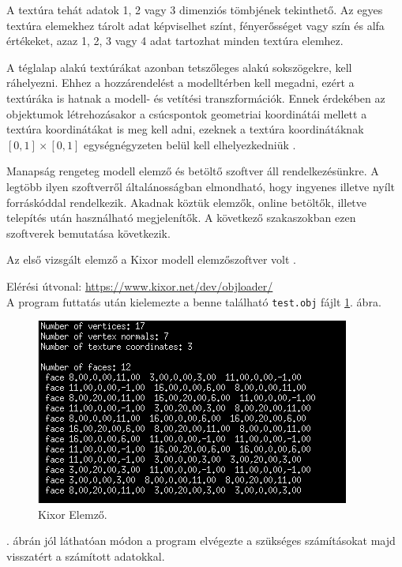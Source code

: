 A textúra tehát adatok 1, 2 vagy 3 dimenziós tömbjének tekinthető. Az egyes textúra elemekhez tárolt adat képviselhet színt, fényerősséget vagy szín és alfa értékeket, azaz 1, 2, 3 vagy 4 adat  tartozhat minden textúra elemhez.

A téglalap alakú textúrákat azonban tetszőleges alakú sokszögekre, kell ráhelyezni. Ehhez a hozzárendelést a modelltérben kell megadni, ezért  a textúráka is hatnak a modell- és vetítési transzformációk. Ennek érdekében az objektumok létrehozásakor a csúcspontok geometriai koordinátái mellett a textúra koordinátákat is meg kell adni, ezeknek a textúra koordinátáknak $[0, 1] \times [0, 1]$ egységnégyzeten belül kell elhelyezkedniük \cite{juhasz2003opengl}.


Manapság rengeteg modell elemző és betöltő szoftver áll rendelkezésünkre. A legtöbb ilyen szoftverről általánosságban elmondható, hogy ingyenes illetve  nyílt forráskóddal rendelkezik. Akadnak köztük elemzők, online betöltők, illetve telepítés után használható megjelenítők. A következő szakaszokban ezen szoftverek bemutatása következik.


Az első vizsgált elemző a Kixor modell elemzőszoftver volt \cite{micah1987markup}.

Elérési útvonal: \url{https://www.kixor.net/dev/objloader/}\\

A program futtatás után kielemezte a benne található \texttt{test.obj} fájlt \ref{fig:kixor}. ábra.
\bigskip
\begin{figure}[h]
\centering
\includegraphics[scale=0.8]{images/kixor.png}
\caption{Kixor Elemző.}
\label{fig:kixor}
\end{figure}
\bigskip

. ábrán jól láthatóan módon a program elvégezte a szükséges számításokat majd visszatért a számított adatokkal.

